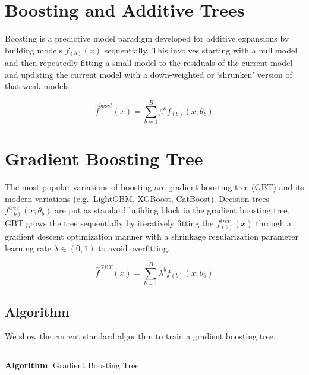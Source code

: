 \documentclass[
]{book}
\begin{document}
\hypertarget{boosting-and-additive-trees}{%
\section{Boosting and Additive Trees}\label{boosting-and-additive-trees}}

Boosting is a predictive model paradigm developed for additive expansions by building models \(f_{(b)}(x)\) sequentially. This involves starting with a null model and then repeatedly fitting a small model to the residuals of the current model and updating the current model with a down-weighted or `shrunken' version of that weak models.

\begin{equation} 
\hat{f}^{boost}(x) = \sum_{b=1}^B \beta^b   f_{(b)}(x; \theta_b)
\label{eq:boosted}
\end{equation}

\hypertarget{gradient-boosting-tree}{%
\section{Gradient Boosting Tree}\label{gradient-boosting-tree}}

The most popular variations of boosting are gradient boosting tree (GBT) and its modern variations (e.g.~LightGBM, XGBoost, CatBoost). Decision trees \(f_{(b)}^{tree}(x; \theta_b)\) are put as standard building block in the gradient boosting tree. GBT grows the tree sequentially by iteratively fitting the \(f_{(b)}^{tree}(x)\) through a gradient descent optimization manner with a shrinkage regularization parameter learning rate \(\lambda \in (0,1)\) to avoid overfitting.

\begin{equation} 
\hat{f}^{GBT}(x) = \sum_{b=1}^B \lambda^b   f_{(b)}(x; \theta_b)
\label{eq:gbtree}
\end{equation}

\hypertarget{algorithm}{%
\subsection{Algorithm}\label{algorithm}}

We show the current standard algorithm to train a gradient boosting tree.

\begin{center}\rule{0.5\linewidth}{0.5pt}\end{center}

\textbf{Algorithm}: Gradient Boosting Tree
\end{document}
